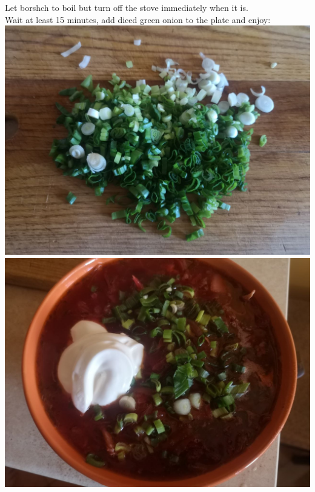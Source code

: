 \documentclass[11pt,a4paper]{article}
\begin{document}
Let borshch to boil but turn off the stove immediately when it is. \\
Wait at least 15 minutes, add diced green onion to the plate and enjoy: \\
\includegraphics[width=\textwidth]{18.jpg} \\
\includegraphics[width=\textwidth]{19.jpg} \\




\newpage
\
\newpage
\doclicenseThis
\end{document}
